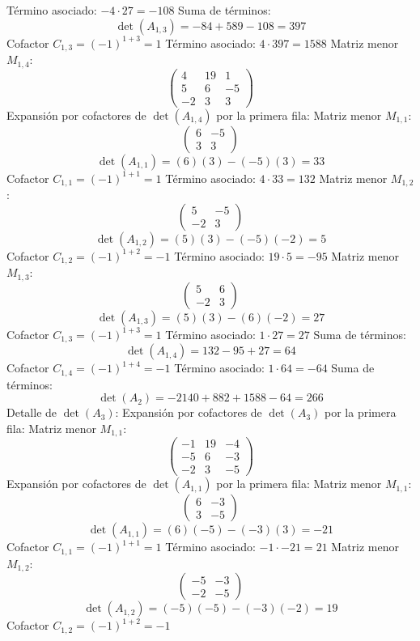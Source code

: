 \documentclass{article}
\begin{document}
Término asociado: $ -4 \cdot 27 = -108 $
Suma de términos:
\[\det(A_{1,3}) = -84 + 589 - 108 = 397\]
Cofactor $C_{1,3} = (-1)^{1+3} = 1$
Término asociado: $ 4 \cdot 397 = 1588 $
Matriz menor $M_{1,4}$:
\[\begin{pmatrix}4 & 19 & 1 \\ 5 & 6 & -5 \\ -2 & 3 & 3\end{pmatrix}\]
Expansión por cofactores de $\det(A_{1,4})$ por la primera fila:
Matriz menor $M_{1,1}$:
\[\begin{pmatrix}6 & -5 \\ 3 & 3\end{pmatrix}\]
\[\det(A_{1,1}) = (6)(3) - (-5)(3) = 33\]
Cofactor $C_{1,1} = (-1)^{1+1} = 1$
Término asociado: $ 4 \cdot 33 = 132 $
Matriz menor $M_{1,2}$:
\[\begin{pmatrix}5 & -5 \\ -2 & 3\end{pmatrix}\]
\[\det(A_{1,2}) = (5)(3) - (-5)(-2) = 5\]
Cofactor $C_{1,2} = (-1)^{1+2} = -1$
Término asociado: $ 19 \cdot 5 = -95 $
Matriz menor $M_{1,3}$:
\[\begin{pmatrix}5 & 6 \\ -2 & 3\end{pmatrix}\]
\[\det(A_{1,3}) = (5)(3) - (6)(-2) = 27\]
Cofactor $C_{1,3} = (-1)^{1+3} = 1$
Término asociado: $ 1 \cdot 27 = 27 $
Suma de términos:
\[\det(A_{1,4}) = 132 - 95 + 27 = 64\]
Cofactor $C_{1,4} = (-1)^{1+4} = -1$
Término asociado: $ 1 \cdot 64 = -64 $
Suma de términos:
\[\det(A_{2}) = -2140 + 882 + 1588 - 64 = 266\]
Detalle de $\det(A_{3})$:
Expansión por cofactores de $\det(A_{3})$ por la primera fila:
Matriz menor $M_{1,1}$:
\[\begin{pmatrix}-1 & 19 & -4 \\ -5 & 6 & -3 \\ -2 & 3 & -5\end{pmatrix}\]
Expansión por cofactores de $\det(A_{1,1})$ por la primera fila:
Matriz menor $M_{1,1}$:
\[\begin{pmatrix}6 & -3 \\ 3 & -5\end{pmatrix}\]
\[\det(A_{1,1}) = (6)(-5) - (-3)(3) = -21\]
Cofactor $C_{1,1} = (-1)^{1+1} = 1$
Término asociado: $ -1 \cdot -21 = 21 $
Matriz menor $M_{1,2}$:
\[\begin{pmatrix}-5 & -3 \\ -2 & -5\end{pmatrix}\]
\[\det(A_{1,2}) = (-5)(-5) - (-3)(-2) = 19\]
Cofactor $C_{1,2} = (-1)^{1+2} = -1$
\end{document}
